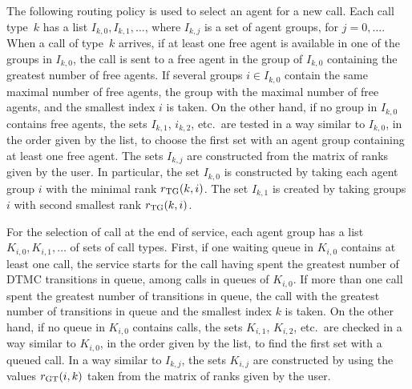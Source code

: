 The following routing policy is used to select an agent for a new call.
Each call type~$k$ has a list
$I_{k, 0}, I_{k, 1}, \ldots$, where $I_{k,j}$ is a set of
agent groups, for $j=0,\ldots$.
When a call of type~$k$ arrives,
if at least one free agent is available in one of the groups in $I_{k,0}$,
the call is sent to a free agent in the group of $I_{k,0}$ containing the
greatest number of free agents.
If several groups $i\in I_{k,0}$ contain the same maximal number of free
agents, the group with the maximal number of free agents, and
the smallest index $i$ is taken.
On the other hand, if no group in $I_{k,0}$ contains free agents, the
sets $I_{k,1}$, $i_{k,2}$, etc.\ are tested in a way
similar to $I_{k,0}$, in the order given by the list,  to
choose the first set with an agent group containing at least one free agent.
The sets $I_{k,j}$ are constructed from the matrix of ranks given by
the user. In particular,
the set $I_{k,0}$ is constructed by taking each agent group $i$ with the
minimal rank $\rTG(k,i)$.
The set $I_{k,1}$ is created by taking groups $i$ with second smallest
rank $\rTG(k,i)$.

For the selection of call at the end of service, each agent group has
a list
$K_{i,0}, K_{i,1}, \ldots$ of sets of call types.
First, if one waiting queue in $K_{i,0}$ contains at least one call,
the service starts
for the call having spent the greatest number of DTMC transitions in
queue, among calls in queues of $K_{i,0}$.
If more than one call spent the greatest number of transitions in queue,
the call with the greatest number of transitions in queue and
the smallest index $k$ is taken.
On the other hand, if no queue in $K_{i,0}$ contains calls,
the sets $K_{i,1}$, $K_{i,2}$, etc.\ are checked in a way
similar to $K_{i,0}$, in the order given by the list, to find the
first set with a queued call.
In a way similar to $I_{k,j}$, the sets $K_{i,j}$ are constructed by
using the values $\rGT(i,k)$ taken from the matrix of ranks given by
the user.
